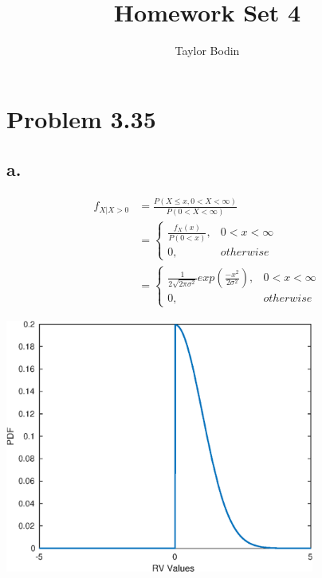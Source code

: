 \documentclass[12pt]{article}
\begin{document}
\title{Homework Set 4}
\author{Taylor Bodin}
\maketitle

\section*{Problem 3.35}
\subsection*{a.}
\begin{align*}
  f_{X|X>0} &= \frac{P(X \leq x, 0<X<\infty)}{P(0<X<\infty)} \\
  &= \begin{cases} 
        \frac{f_X(x)}{P(0<x)}, & 0 < x < \infty \\
        0, & otherwise 
     \end{cases} \\
  &= \begin{cases} 
        \frac{1}{2\sqrt{2\pi\sigma^2}}exp(\frac{-x^2}{2\sigma^2}), & 0 < x < \infty \\
        0, & otherwise 
      \end{cases}
\end{align*}

\includegraphics [width=4in]{fig_3_35_a.eps}
\end{document}
